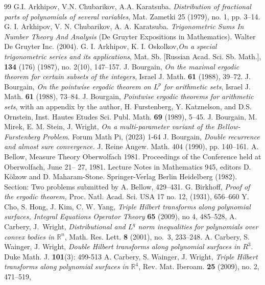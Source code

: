 \documentclass[10pt,a4paper]{amsart}
\numberwithin{equation}{section}
\begin{document}
\begin{thebibliography}{99}
 G.I. Arkhipov, V.N. Chubarikov, A.A. Karatsuba. \emph{Distribution of fractional parts of polynomials of several variables}, Mat. Zametki 25 (1979), no. 1, pp. 3–14.
 G. I. Arkhipov, V. N. Chubarikov, A. A. Karatsuba. \emph{Trigonometric Sums In Number Theory And Analysis} (De Gruyter Expositions in Mathematics). Walter De Gruyter Inc. (2004).
 G. I. Arkhipov, K. I. Oskolkov,\emph{On a special trigonometric series and its applications}, Mat. Sb. [Russian Acad. Sci. Sb. Math.], \textbf{134} (176) (1987), no. 2(10), 147–157.
 J. Bourgain, \emph{On the maximal ergodic theorem for certain subsets of the integers}, Israel J. Math. \textbf{61} (1988), 39--72.
 J. Bourgain, \emph{On the pointwise ergodic theorem on $L^{p}$ for arithmetic sets}, Israel J. Math. \textbf{61} (1988), 73--84.
 J. Bourgain, \emph{Pointwise ergodic theorems for arithmetic sets}, with an appendix by the author, H. Furstenberg, Y. Katznelson, and D.S. Ornstein, Inst. Hautes Etudes Sci. Publ. Math. \textbf{69} (1989), 5--45.
 J. Bourgain, M. Mirek, E. M. Stein, J. Wright, \emph{On a multi-parameter variant of the Bellow-Furstenberg Problem}. Forum Math Pi,  (2023) 1-64
 J. Bourgain, \emph{ Double recurrence and almost sure convergence.} J. Reine Angew. Math. 404 (1990), pp. 140–161.
 A. Bellow, Measure Theory Oberwolfach 1981. Proceedings of the Conference held at Oberwolfach, June 21– 27, 1981. Lecture Notes in Mathematics 945, editors D. Kölzow and D. Maharam-Stone. Springer-Verlag Berlin Heidelberg (1982). Section: Two problems submitted by A. Bellow, 429–431.
 G. Birkhoff, \emph{ Proof of the ergodic theorem,} Proc. Natl. Acad. Sci. USA 17 no. 12, (1931), 656–660
 Y. Cho, S. Hong, J. Kim, C. W. Yang, \emph{Triple Hilbert transforms along polynomial surfaces, Integral Equations Operator Theory} \textbf{65} (2009), no 4, 485--528,
 A. Carbery, J.~Wright, \emph{Distributional and $L^q$ norm inequalities for polynomials over convex bodies in $\mathbb{R}^n$}, Math. Res. Lett. \textbf{8} (2001), no.~3, 233--248.
 A. Carbery, S. Wainger, J. Wright, \emph{Double Hilbert transforms along polynomial surfaces in $R^{3}$}. Duke Math. J. \textbf{101}(3): 499-513
 A. Carbery, S. Wainger, J. Wright, \emph{Triple Hilbert transforms along polynomial surfaces in $\mathbb{R}^4$}, Rev. Mat. Iberoam. \textbf{25} (2009), no. 2, 471--519,

\end{thebibliography}
\end{document}
